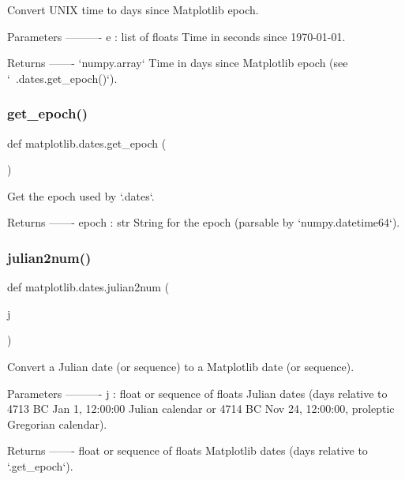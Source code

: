 \begin{DoxyVerb}Convert UNIX time to days since Matplotlib epoch.

Parameters
----------
e : list of floats
    Time in seconds since 1970-01-01.

Returns
-------
`numpy.array`
    Time in days since Matplotlib epoch (see `~.dates.get_epoch()`).
\end{DoxyVerb}
 \mbox{\label{namespacematplotlib_1_1dates_ae6353b45ff67fc42ceee4922fbc8a774}} 
\subsubsection{\texorpdfstring{get\+\_\+epoch()}{get\_epoch()}}
{\footnotesize\ttfamily def matplotlib.\+dates.\+get\+\_\+epoch (\begin{DoxyParamCaption}{ }\end{DoxyParamCaption})}

\begin{DoxyVerb}Get the epoch used by `.dates`.

Returns
-------
epoch : str
    String for the epoch (parsable by `numpy.datetime64`).
\end{DoxyVerb}
 \mbox{\label{namespacematplotlib_1_1dates_a2d561ed462a5cee845b40f90dd09fab2}} 
\subsubsection{\texorpdfstring{julian2num()}{julian2num()}}
{\footnotesize\ttfamily def matplotlib.\+dates.\+julian2num (\begin{DoxyParamCaption}\item[{}]{j }\end{DoxyParamCaption})}

\begin{DoxyVerb}Convert a Julian date (or sequence) to a Matplotlib date (or sequence).

Parameters
----------
j : float or sequence of floats
    Julian dates (days relative to 4713 BC Jan 1, 12:00:00 Julian
    calendar or 4714 BC Nov 24, 12:00:00, proleptic Gregorian calendar).

Returns
-------
float or sequence of floats
    Matplotlib dates (days relative to `.get_epoch`).
\end{DoxyVerb}
 \mbox{\label{namespacematplotlib_1_1dates_aa42eebf54c03fafaef7987f4d4b58738}} 
